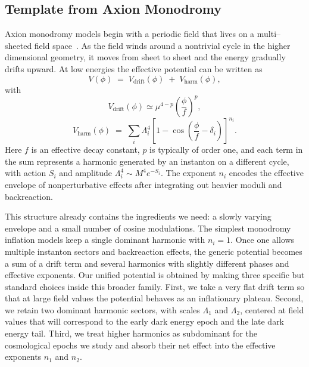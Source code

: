 \documentclass[a4paper,11pt]{article}
\begin{document}

\subsection{Template from Axion Monodromy}
\label{sec:monodromy_template}

Axion monodromy models begin with a periodic field that lives on a multi–sheeted field space~\cite{Silverstein_Westphal, McAllister_monodromy}. As the field winds around a nontrivial cycle in the higher dimensional geometry, it moves from sheet to sheet and the energy gradually drifts upward. At low energies the effective potential can be written as
\begin{equation}
    V(\phi) \;=\; V_{\text{drift}}(\phi) \;+\; V_{\text{harm}}(\phi),
\end{equation}
with
\begin{equation}
    V_{\text{drift}}(\phi) \simeq \mu^{4-p} \left(\frac{\phi}{f}\right)^{p},
\end{equation}
\begin{equation}
    V_{\text{harm}}(\phi) \;=\; \sum_i \Lambda_i^4 \left[1 - \cos\!\left(\frac{\phi}{f} - \delta_i\right)\right]^{n_i}.
\end{equation}
Here $f$ is an effective decay constant, $p$ is typically of order one, and each term in the sum represents a harmonic generated by an instanton on a different cycle, with action $S_i$ and amplitude $\Lambda_i^4 \sim M^4 e^{-S_i}$. The exponent $n_i$ encodes the effective envelope of nonperturbative effects after integrating out heavier moduli and backreaction.

This structure already contains the ingredients we need: a slowly varying envelope and a small number of cosine modulations. The simplest monodromy inflation models keep a single dominant harmonic with $n_i = 1$. Once one allows multiple instanton sectors and backreaction effects, the generic potential becomes a sum of a drift term and several harmonics with slightly different phases and effective exponents. Our unified potential is obtained by making three specific but standard choices inside this broader family. First, we take a very flat drift term so that at large field values the potential behaves as an inflationary plateau. Second, we retain two dominant harmonic sectors, with scales $\Lambda_1$ and $\Lambda_2$, centered at field values that will correspond to the early dark energy epoch and the late dark energy tail. Third, we treat higher harmonics as subdominant for the cosmological epochs we study and absorb their net effect into the effective exponents $n_1$ and $n_2$.
\end{document}
